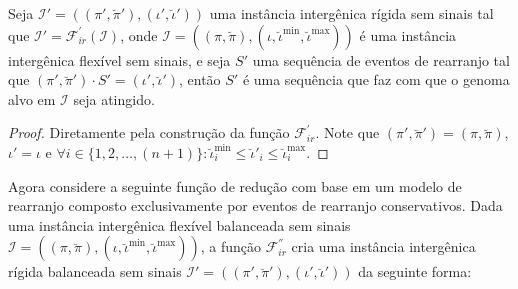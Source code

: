 \begin{lemma}\label{lemma:SVKOAOXA}
Seja $\mathcal{I'} = ((\pi',\breve\pi'),(\iota',\breve\iota'))$ uma instância intergênica rígida sem sinais tal que $\mathcal{I'} = \mathcal{F}_{ir}^{'}(\mathcal{I})$, onde $\mathcal{I} = ((\pi,\breve\pi),(\iota,\breve\iota^{\min},\breve\iota^{\max}))$ é uma instância intergênica flexível sem sinais, e seja $S'$ uma sequência de eventos de rearranjo tal que $(\pi',\breve\pi') \cdot S' = (\iota',\breve\iota')$, então $S'$ é uma sequência que faz com que o genoma alvo em $\mathcal{I}$ seja atingido.
\end{lemma}
\begin{proof}
Diretamente pela construção da função $\mathcal{F}_{ir}^{'}$. Note que $(\pi',\breve\pi') = (\pi,\breve\pi)$, $\iota' = \iota$ e $\forall i \in \{1,2,\dots,({n+1})\}: \breve\iota^{\min}_i \le \breve\iota'_i \le \breve\iota^{\max}_i$.
\end{proof}

Agora considere a seguinte função de redução com base em um modelo de rearranjo composto exclusivamente por eventos de rearranjo conservativos. Dada uma instância intergênica flexível balanceada sem sinais $\mathcal{I} = ((\pi,\breve\pi),(\iota,\breve\iota^{\min},\breve\iota^{\max}))$, a função $\mathcal{F}_{ir}^{''}$ cria uma instância intergênica rígida balanceada sem sinais $\mathcal{I'} = ((\pi',\breve\pi'),(\iota',\breve\iota'))$ da seguinte forma:

